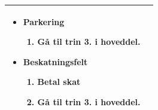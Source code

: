 \begin{center}
\begin{longtable}{|l|p{11cm}|}
\begin{minipage}[t]{1\textwidth}
\begin{itemize}
     \item Parkering
     \begin{enumerate}
         \item Gå til trin 3. i hoveddel.
     \end{enumerate}
     \item Beskatningsfelt
     \begin{enumerate}
         \item Betal skat
         \item Gå til trin 3. i hoveddel.
     \end{enumerate}
 \end{itemize}
\end{minipage}

\\
\hline
\end{longtable}
\end{center}


